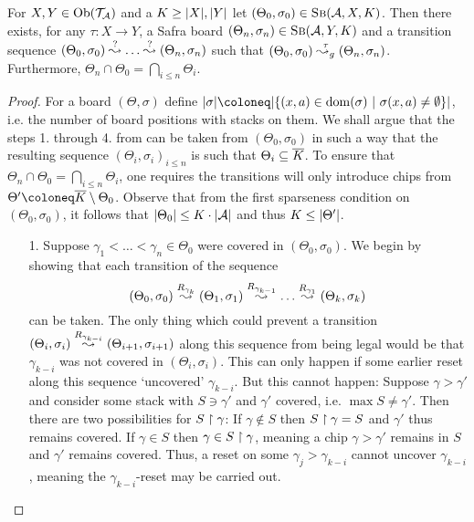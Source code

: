 \begin{lemma}\label{lem:greedy-ceil}
  For $X, Y \in \mathrm{Ob}(\mathcal{T}_{\mathcal{A}})$ and a $K \geq |X|, |Y|$
  let $(\Theta_0, \sigma_0) \in \textsc{Sb}(\mathcal{A}, X, K)$.
  Then there exists, for any $\tau \colon X \to Y$, a Safra board $(\Theta_n,
  \sigma_n) \in \textsc{Sb}(\mathcal{A}, Y, K)$ and a transition sequence $(\Theta_0, \sigma_0)
  \stackrel{?}{\leadsto} \ldots \stackrel{?}{\leadsto} (\Theta_n, \sigma_n)$ such that $(\Theta_0, \sigma_0)
  \stackrel{\tau}{\leadsto_g} (\Theta_n, \sigma_n)$. Furthermore, $\Theta_n \cap
  \Theta_0 = \bigcap_{i \leq n} \Theta_i $.
\end{lemma}
\begin{proof}
  For a board $(\Theta, \sigma)$ define $\abs{\sigma} \coloneq
  \abs{\{(x, a) \in \dom(\sigma) ~|~ \sigma(x, a) \neq \emptyset\}}$, i.e. the
  number of board positions with stacks on them.
  We shall argue that the steps 1. through 4. from  can be taken
  from $(\Theta_0, \sigma_0)$ in such a way that the resulting sequence $(\Theta_i,
  \sigma_i)_{i \leq n}$ is such that $\Theta_i \subseteq \overline{K}$. To ensure
  that $\Theta_n \cap \Theta_0 = \bigcap_{i \leq n} \Theta_i$, one requires the
  transitions will only introduce chips from $\Theta' \coloneq \ol{K}
  \setminus \Theta_0$. Observe that from the first sparseness condition on $(\Theta_0,
  \sigma_0)$, it follows that $|\Theta_0| \leq K \cdot |\mathcal{A}|$ and
  thus $K \leq |\Theta'|$.
  \begin{enumerate}
  \item[1.] Suppose $\gamma_1 < \ldots < \gamma_n \in \Theta_0$ were covered in
    $(\Theta_0, \sigma_0)$. We begin by showing that each transition of the sequence
    \[(\Theta_0, \sigma_0) \stackrel{R_{\gamma_k}}{\leadsto} (\Theta_1, \sigma_1)
      \stackrel{R_{\gamma_{k - 1}}}{\leadsto} \ldots
      \stackrel{R_{\gamma_1}}{\leadsto} (\Theta_k, \sigma_k)\]
    can be taken. The only thing which could prevent a transition $(\Theta_i,
    \sigma_i) \stackrel{R_{\gamma_{k - i}}}{\leadsto} (\Theta_{ i + 1}, \sigma_{i + 1})$ along this
    sequence from being legal would be that $\gamma_{k - i}$ was not covered in
    $(\Theta_i, \sigma_i)$. This can only happen if some earlier reset along
    this sequence `uncovered' $\gamma_{k - i}$. But this cannot happen:
    Suppose $\gamma > \gamma'$ and consider some stack with $S \ni \gamma'$ and
    $\gamma'$ covered, i.e. $\max S \neq \gamma'$. Then there are two
    possibilities for $S \upharpoonright \gamma$: If $\gamma \not\in S$ then
    $S \upharpoonright \gamma = S$ and $\gamma'$ thus remains covered. If $\gamma \in
    S$ then $\gamma \in S \upharpoonright \gamma$, meaning a chip $\gamma > \gamma'$
    remains in $S$ and $\gamma'$ remains covered. Thus, a reset on some
    $\gamma_j > \gamma_{k - i}$ cannot uncover $\gamma_{k - i}$, meaning the
    $\gamma_{k - i}$-reset may be carried out.


\end{enumerate}
\end{proof}
